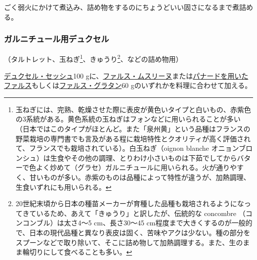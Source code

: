 \begin{recette}
ごく弱火にかけて煮込み、詰め物をするのにちょうどいい固さになるまで煮詰める。

\hypertarget{duxelles-pour-farnitures-diverses}{%
\subsubsection{ガルニチュール用デュクセル}\label{duxelles-pour-farnitures-diverses}}



（タルトレット、玉ねぎ\footnote{玉ねぎには、完熟、乾燥させた際に表皮が黄色いタイプと白いもの、赤紫色の3系統がある。黄色系統の玉ねぎはフォンなどに用いられることが多い（日本ではこのタイプがほとんど。また「泉州黄」という品種はフランスの野菜栽培の専門書でも言及がある程に栽培特性とクオリティが高く評価されて、フランスでも栽培されている）。白玉ねぎ（oignon
  blanche
  オニョンブロンシュ）は生食やその他の調理、とりわけ小さいものは下茹でしてからバターで色よく炒めて（グラセ）ガルニチュールに用いられる。火が通りやすく、甘いものが多い。赤紫のものは品種によって特性が違うが、加熱調理、生食いずれにも用いられる。}、きゅうり\footnote{20世紀末頃から日本の種苗メーカーが育種した品種も栽培されるようになってきているため、あえて「きゅうり」と訳したが、伝統的な
  concombre （コンコンブル）は太さ4〜5 cm、長さ30〜45
  cm程度まで大きくするのが一般的で、日本の現代品種と異なり表皮は固く、苦味やアクは少ない。種の部分をスプーンなどで取り除いて、そこに詰め物して加熱調理する。また、生のまま輪切りにして食べることも多い。}、などの詰め物用）

\protect\hyperlink{duxelles-seche}{デュクセル・セッシュ}100
gに、\protect\hyperlink{farce-c}{ファルス・ムスリーヌ}または\protect\hyperlink{farce-a}{パナードを用いたファルス}もしくは\protect\hyperlink{farce-gratin-a}{ファルス・グラタン}60
gのいずれかを料理に合わせて加える。


\end{recette}
